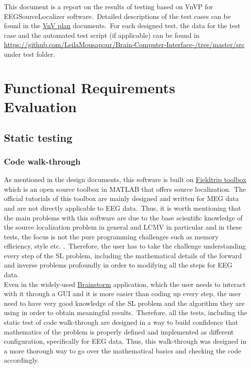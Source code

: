 \documentclass[12pt, titlepage]{article}
\renewcommand{\progname}{EEGSourceLocalizer}
\begin{document}
\newpage

\tableofcontents

\listoftables %

\listoffigures %

\newpage


This document is a report on the results of testing based on VnVP for \progname{} software.\ Detailed descriptions of the test cases can be found in the \href{https://github.com/LeilaMousapour/Brain-Computer-Interface-/tree/master/docs/VnVPlan}{VnV plan} documents.\ For each designed test, the data for the test case and the automated test script (if applicable) can be found in \url{https://github.com/LeilaMousapour/Brain-Computer-Interface-/tree/master/src} under test folder.

\section{Functional Requirements Evaluation}

\subsection{Static testing}

\subsubsection{Code walk-through}
\label{codewalk}

As mentioned in the design documents, this software is built on \href{https://www.fieldtriptoolbox.org}{Fieldtrip toolbox} which is an open source toolbox in MATLAB that offers source localization.\ The official tutorials of this toolbox are mainly designed and written for MEG data and are not directly applicable to EEG data.\ 
Thus, it is worth mentioning that the main problems with this software are due to the base scientific knowledge of the source localization problem in general and LCMV in particular and in these tests, the focus is not the pure programming challenges such as memory efficiency, style etc. .\ Therefore, the user has to take the challenge understanding every step of the SL problem, including the mathematical details of the forward and inverse problems profoundly in order to modifying all the steps for EEG data.\\

Even in the widely-used  \href{https://neuroimage.usc.edu/brainstorm/Introduction}{Brainstorm} application, which the user needs to interact with it through a GUI and it is more easier than coding up every step, the user need to have very good knowledge of the SL problem and the algorithm they are using in order to obtain meaningful results.\ Therefore, all the tests, including the static test of code walk-through are designed in a way to build confidence that mathematics of the problem is properly defined and implemented as different configuration, specifically for EEG data. Thus, this walk-through was designed in a more thorough way to go over the mathematical basics and checking the code accordingly.\\ 
\end{document}
